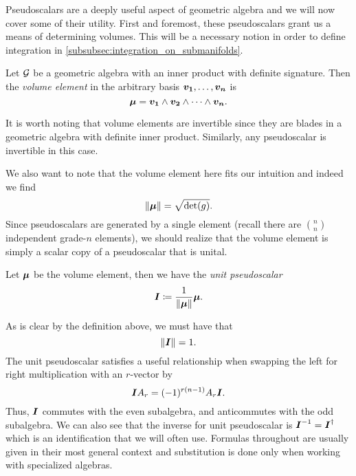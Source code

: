 Pseudoscalars are a deeply useful aspect of geometric algebra and we will now cover some of their utility. First and foremost, these pseudoscalars grant us a means of determining volumes. This will be a necessary notion in order to define integration in \cref{subsubsec:integration_on_submanifolds}.
\begin{definition}
Let $\mathcal{G}$ be a geometric algebra with an inner product with definite signature. Then the \emph{volume element} in the arbitrary basis $\boldsymbol{v_1},\dots,\boldsymbol{v_n}$ is 
\begin{equation}
\boldsymbol{\mu}=\boldsymbol{v_1} \wedge \boldsymbol{v_2} \wedge \cdots \wedge \boldsymbol{v_n}.
\end{equation}
\end{definition}
It is worth noting that volume elements are invertible since they are blades in a geometric algebra with definite inner product. Similarly, any pseudoscalar is invertible in this case. 

We also want to note that the volume element here fits our intuition and indeed we find
\begin{equation}
\label{eq:pseudoscalar_norm}
\|\boldsymbol{\mu}\| = \sqrt{\det(g)}.
\end{equation}
Since pseudoscalars are generated by a single element (recall there are ${n \choose n}$ independent grade-$n$ elements), we should realize that the volume element is simply a scalar copy of a pseudoscalar that is unital.
\begin{definition}
Let $\boldsymbol{\mu}$ be the volume element, then we have the \emph{unit pseudoscalar}
\begin{equation}
\boldsymbol{I} \coloneqq \frac{1}{\|\boldsymbol{\mu}\|} \boldsymbol{\mu}.
\end{equation}
\end{definition}
As is clear by the definition above, we must have that
\begin{equation}
\|\boldsymbol{I}\| = 1.
\end{equation}
The unit pseudoscalar satisfies a useful relationship when swapping the left for right multiplication with an $r$-vector by
\begin{equation}
\boldsymbol{I} A_r = (-1)^{r(n-1)} A_r \boldsymbol{I}.
\end{equation}
Thus, $\boldsymbol{I}$ commutes with the even subalgebra, and anticommutes with the odd subalgebra. We can also see that the inverse for unit pseudoscalar is $\boldsymbol{I}^{-1}=\boldsymbol{I}^\dagger$ which is an identification that we will often use. Formulas throughout are usually given in their most general context and substitution is done only when working with specialized algebras.  

